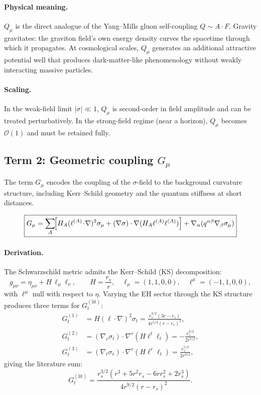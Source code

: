 \documentclass[11pt,a4paper]{article}
\theoremstyle{plain}
\theoremstyle{definition}
\theoremstyle{remark}
\newcommand{\sigt}{\sigma_t}
\newcommand{\rs}{r_s}
\begin{document}
\paragraph{Physical meaning.}
$Q_\mu$ is the direct analogue of the Yang--Mills gluon self-coupling $Q \sim A\cdot F$.
Gravity gravitates: the graviton field's own energy density curves the spacetime through
which it propagates.  At cosmological scales, $Q_\mu$ generates an additional attractive
potential well that produces dark-matter-like phenomenology without weakly interacting
massive particles.

\paragraph{Scaling.}  In the weak-field limit $|\sigma| \ll 1$, $Q_\mu$ is second-order
in field amplitude and can be treated perturbatively.  In the strong-field regime (near
a horizon), $Q_\mu$ becomes $\mathcal{O}(1)$ and must be retained fully.

\subsection{Term 2: Geometric coupling $G_\mu$}
\label{sec:Gmu}

The term $G_\mu$ encodes the coupling of the $\sigma$-field to the background curvature
structure, including Kerr--Schild geometry and the quantum stiffness at short distances.

\begin{equation}
  \boxed{G_\mu
    = \sum_A\!\Bigl[H_A(\ell^{(A)}\!\cdot\!\nabla)^2\sigma_\mu
      + (\nabla\sigma)\cdot\nabla(H_A\ell^{(A)}\ell^{(A)})\Bigr]
    + \nabla_\alpha(q^{\alpha\beta}\nabla_\beta\sigma_\mu)}
  \label{eq:G}
\end{equation}

\paragraph{Derivation.}
The Schwarzschild metric admits the Kerr--Schild (KS) decomposition:
\[
  g_{\mu\nu} = \eta_{\mu\nu} + H\,\ell_\mu\ell_\nu,
  \qquad H = \frac{\rs}{r},\quad
  \ell_\mu = (1,1,0,0),\quad
  \ell^\mu = (-1,1,0,0),
\]
with $\ell^\mu$ null with respect to $\eta$.  Varying the EH sector through the
KS structure produces three terms for $G_t^{(\mathrm{lit})}$:
\begin{align}
  G_t^{(1)} &= H(\ell\cdot\nabla)^2\sigt
    = \frac{\rs^{3/2}(3r-\rs)}{4r^{5/2}(r-\rs)^2},
    \label{eq:G1}\\
  G_t^{(2)} &= (\nabla_r\sigt)\cdot\nabla^r(H\ell^t\ell_t)
    = -\frac{\rs^{3/2}}{2r^{7/2}},
    \label{eq:G2}\\
  G_t^{(3)} &= (\nabla_t\sigma_r)\cdot\nabla^r(H\ell^r\ell_t)
    = \frac{\rs^{5/2}}{2r^{9/2}},
    \label{eq:G3}
\end{align}
giving the literature sum:
\begin{equation}
  G_t^{(\mathrm{lit})} = \frac{\rs^{3/2}(r^3+5r^2\rs-6r\rs^2+2\rs^3)}
                              {4r^{9/2}(r-\rs)^2}.
  \label{eq:Glit}
\end{equation}
\end{document}
